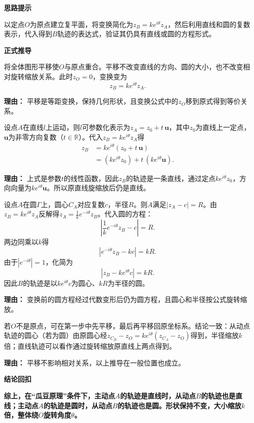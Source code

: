 \begin{proofbox}
	\textbf{\textcolor{CProof}{思路提示}}

	以定点$O$为原点建立复平面，将变换简化为$z_B = k e^{i\theta} z_A$，然后利用直线和圆的复数表示，代入得到$B$轨迹的表达式，验证其仍具有直线或圆的方程形式。

	\medskip
	\textbf{\textcolor{CProof}{正式推导}}
	\begin{description}[style=nextline, leftmargin=2.8em, labelsep=0.5em, itemsep=0.55em]
		\item[\textbf{步骤一（平移简化）：}] 将全体图形平移使$O$与原点重合。平移不改变直线的方向、圆的大小，也不改变相对旋转缩放关系。此时$z_O=0$，变换变为
			\[
				z_B = k e^{i\theta} z_A.
			\]
			\par\textbf{理由：} 平移是等距变换，保持几何形状，且变换公式中的$z_O$移到原式得到等价关系。

		\item[\textbf{步骤二（直线证明）：}] 设点$A$在直线$l$上运动，则$l$可参数化表示为$z_A = z_0 + t\,\mathbf{u}$，其中$z_0$为直线上一定点，$\mathbf{u}$为非零方向复数（$t\in\mathbb{R}$）。代入$z_B = k e^{i\theta} z_A$得
			\[
				\begin{aligned}
					z_B &= k e^{i\theta}(z_0 + t\,\mathbf{u}) \\
					&= (k e^{i\theta}z_0) + t\,(k e^{i\theta}\mathbf{u}).
			\end{aligned}
			\]
			\par\textbf{理由：} 上式是参数$t$的线性函数，因此$z_B$的轨迹是一条直线，通过定点$k e^{i\theta}z_0$，方向向量为$k e^{i\theta}\mathbf{u}$。所以原直线旋缩放后仍是直线。

		\item[\textbf{步骤三（圆证明）：}] 设点$A$在圆$\Gamma$上，圆心$C_A$对应复数$c$，半径$R$。则$A$满足$|z_A - c| = R$。由$z_B = k e^{i\theta} z_A$反解得$z_A = \frac{1}{k}e^{-i\theta}z_B$。代入圆的方程：
			\[
				\left|\frac{1}{k}e^{-i\theta}z_B - c\right| = R.
			\]
			两边同乘以$k$得
			\[
				\left|e^{-i\theta}z_B - k c\right| = k R.
			\]
			由于$|e^{-i\theta}|=1$，化简为
			\[
				\left|z_B - k e^{i\theta}c\right| = k R.
			\]
			因此$B$的轨迹是以$k e^{i\theta}c$为圆心、$k R$为半径的圆。
			\par\textbf{理由：} 变换前的圆方程经过代数变形后仍为圆方程，且圆心和半径按公式旋转缩放。

		\item[\textbf{步骤四（一般情况）：}] 若$O$不是原点，可在第一步中先平移，最后再平移回原坐标系。结论一致：从动点轨迹的圆心（若为圆）由原圆心经$z_{C_B} - z_O = k e^{i\theta}(z_{C_A} - z_O)$得到，半径缩放$k$倍；直线轨迹可以看作通过旋转缩放原直线上两点得到。
			\par\textbf{理由：} 平移不影响相对关系，以上推导在一般位置也成立。
	\end{description}

	\medskip
	\textbf{\textcolor{CProof}{结论回扣}}

	\textbf{综上，在“瓜豆原理”条件下，主动点$A$的轨迹是直线时，从动点$B$的轨迹也是直线；主动点$A$的轨迹是圆时，从动点$B$的轨迹也是圆。形状保持不变，大小缩放$k$倍，整体绕$O$旋转角度$\theta$。}
\end{proofbox}
